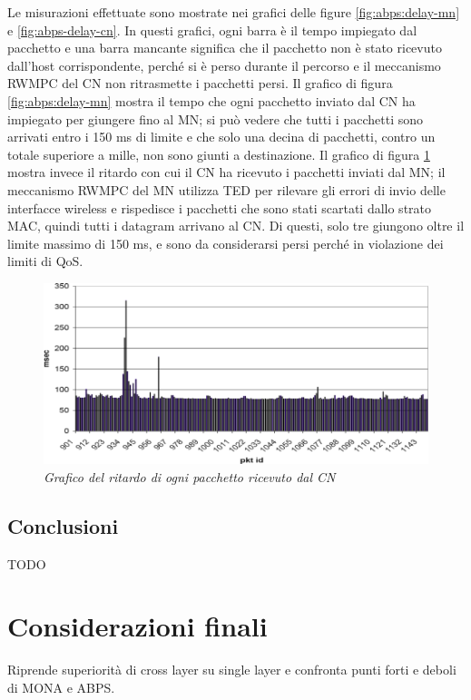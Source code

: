 \documentclass[12pt,a4paper,openright,twoside]{book}
\begin{document}
Le misurazioni effettuate sono mostrate nei grafici delle figure
\ref{fig:abps:delay-mn} e \ref{fig:abps-delay-cn}. In questi grafici,
ogni barra è il tempo impiegato dal pacchetto e una barra mancante
significa che il pacchetto non è stato ricevuto dall'host
corrispondente, perché si è perso durante il percorso e il meccanismo
RWMPC del CN non ritrasmette i pacchetti persi. Il grafico di figura
\ref{fig:abps:delay-mn} mostra il tempo che ogni pacchetto inviato dal
CN ha impiegato per giungere fino al MN; si può vedere che tutti i
pacchetti sono arrivati entro i 150 ms di limite e che solo una decina
di pacchetti, contro un totale superiore a mille, non sono giunti a
destinazione. Il grafico di figura \ref{fig:abps:delay-cn} mostra
invece il ritardo con cui il CN ha ricevuto i pacchetti inviati dal
MN; il meccanismo RWMPC del MN utilizza TED per rilevare gli errori di
invio delle interfacce wireless e rispedisce i pacchetti che sono
stati scartati dallo strato MAC, quindi tutti i datagram arrivano al
CN. Di questi, solo tre giungono oltre il limite massimo di 150 ms, e
sono da considerarsi persi perché in violazione dei limiti di QoS.

\begin{figure}
  \centering
  \includegraphics[width=\textwidth]{img/abps-delay-cn}
  \caption{\em Grafico del ritardo di ogni pacchetto ricevuto dal CN}
  \label{fig:abps:delay-cn}
\end{figure}

\section{Conclusioni}

TODO

\clearpage{\pagestyle{empty}\cleardoublepage}


\chapter{Considerazioni finali}
Riprende superiorità di cross layer su single layer e confronta punti
forti e deboli di MONA e ABPS.
\end{document}
